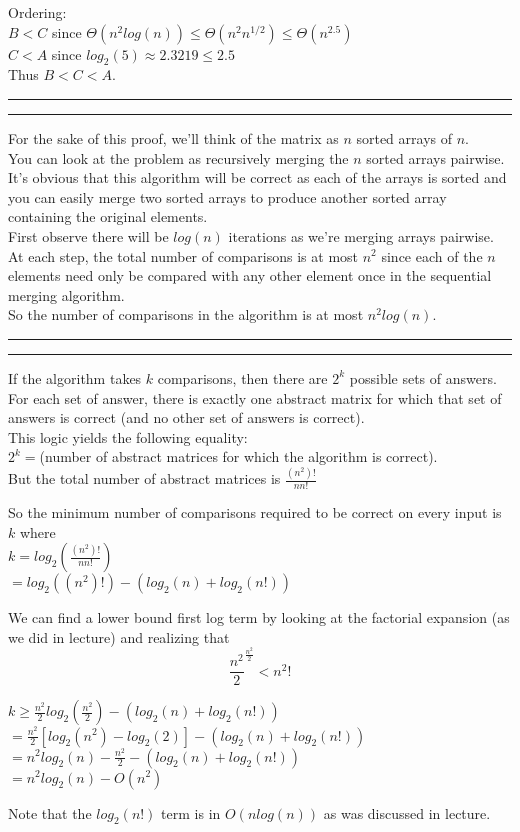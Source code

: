 \documentclass[11pt,letterpaper]{article}
\newcommand{\question}[1] {\vspace{.25in} \hrule\vspace{0.5em}
\noindent{\bf #1} \vspace{0.5em}
\hrule \vspace{.10in}}
\begin{document}
Ordering: \\
$B < C$ since $\Theta(n^{2} log(n)) \leq \Theta(n^{2} n^{1/2}) \leq \Theta(n^{2.5})$\\
$C < A$ since $log_2(5) \approx 2.3219 \leq 2.5$\\
Thus $B < C < A$.


\question{2a}
For the sake of this proof, we'll think of the matrix as $n$ sorted arrays of $n$. \\
You can look at the problem as recursively merging the $n$ sorted arrays pairwise.\\
It's obvious that this algorithm will be correct as each of the arrays is sorted and you can easily
merge two sorted arrays to produce another sorted array containing the original elements.\\
First observe there will be $log(n)$ iterations as we're merging arrays pairwise.\\
At each step, the total number of comparisons is at most $n^2$ since each of the $n$ elements need only be compared with any other element once in the sequential merging algorithm.\\
So the number of comparisons in the algorithm is at most $n^2 log(n)$.

\question{2b}
If the algorithm takes $k$ comparisons, then there are $2^k$ possible sets of answers.\\
For each set of answer, there is exactly one abstract matrix for which that set of answers is correct (and no other set of answers is correct).\\
This logic yields the following equality:\\
$2^k = $(number of abstract matrices for which the algorithm is correct).\\
But the total number of abstract matrices is $\frac{(n^2)!}{n n!}$

So the minimum number of comparisons required to be correct on every input is $k$ where\\
$k = log_2(\frac{(n^2)!}{n n!})$\\
$  = log_2((n^2)!) - (log_2(n) + log_2(n!))$

We can find a lower bound first log term by looking at the factorial expansion (as we did in lecture) and realizing that
$$\frac{n^2}{2}^\frac{n^2}{2} < n^2!$$

$k \geq \frac{n^2}{2} log_2(\frac{n^2}{2}) - (log_2(n) + log_2(n!))$ \\
$     = \frac{n^2}{2} [log_2(n^2) - log_2(2)] - (log_2(n) + log_2(n!))$ \\
$     = n^2 log_2(n) - \frac{n^2}{2} - (log_2(n) + log_2(n!))$ \\
$     = n^2 log_2(n) - O(n^2)$

Note that the $log_2(n!)$ term is in $O(n log(n))$ as was discussed in lecture.
\end{document}
